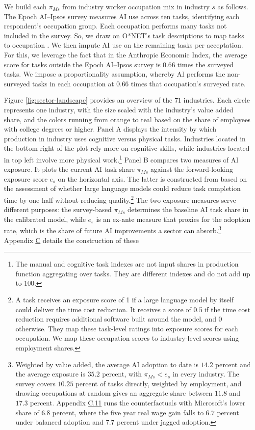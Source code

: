 \documentclass[11pt]{article}
\begin{document}
We build each $\pi_{Ms}$ from industry worker occupation mix in industry
$s$ as follows. The Epoch AI--Ipsos survey measures AI use across
ten tasks, identifying each respondent's occupation group. Each occupation
performs many tasks not included in the survey. So, we draw on O{*}NET's
task descriptions to map tasks to occupation \citep{onet2026}. We
then impute AI use on the remaining tasks per acceptation. For this,
we leverage the fact that in the Anthropic Economic Index, the average
score for tasks outside the Epoch AI--Ipsos survey is $0.66$
times the surveyed tasks. We impose a proportionality assumption,
whereby AI performs the non-surveyed tasks in each occupation at $0.66$
times that occupation's surveyed rate.

Figure \ref{fig:sector-landscape} provides an overview of the $71$
industries. Each circle represents one industry, with the size scaled
with the industry's value added share, and the colors running from
orange to teal based on the share of employees with college degrees
or higher. Panel A displays the intensity by which production in industry
uses cognitive versus physical tasks. Industries located in the bottom
right of the plot rely more on cognitive skills, while industries
located in top left involve more physical work.\footnote{The manual and cognitive task indexes are not input shares in production
function aggregating over tasks. They are different indexes and do
not add up to 100.} Panel B compares two measures of AI exposure. It plots the current
AI task share $\pi_{Ms}$ against the forward-looking exposure score
$e_{s}$ on the horizontal axis. The latter is constructed from \citep{emmr2024}
based on the assessment of whether large language models could reduce
task completion time by one-half without reducing quality.\footnote{A task receives an exposure score of 1 if a large language model by
itself could deliver the time cost reduction. It receives a score
of 0.5 if the time cost reduction requires additional software built
around the model, and 0 otherwise. They map these task-level ratings
into exposure scores for each occupation. We map these occupation
scores to industry-level scores using employment shares.} The two exposure measures serve different purposes: the survey-based
$\ensuremath{\pi_{Ms}}$ determines the baseline AI task share in
the calibrated model, while $e_{s}$ is an ex-ante measure that proxies
for the adoption rate, which is the share of future AI improvements
a sector can absorb.\footnote{Weighted by value added, the average AI adoption to date is $14.2$
percent and the average exposure is $35.2$
percent, with $\pi_{Ms}<e_{s}$ in every industry. The survey covers
$10.25$ percent of tasks directly, weighted
by employment, and drawing occupations at random gives an aggregate
share between $11.8$ and $17.3$
percent. Appendix \href{https://ahmadlp.github.io/Lashkaripour_AI_Displacement_Online_Appendix.pdf\#page=93}{C.11} runs the counterfactuals
with Microsoft's lower share of $6.8$
percent, where the five year real wage gain falls to $6.7$
percent under balanced adoption and $7.7$
percent under jagged adoption.} Appendix \href{https://ahmadlp.github.io/Lashkaripour_AI_Displacement_Online_Appendix.pdf\#page=74}{C} details the construction of these
\end{document}
